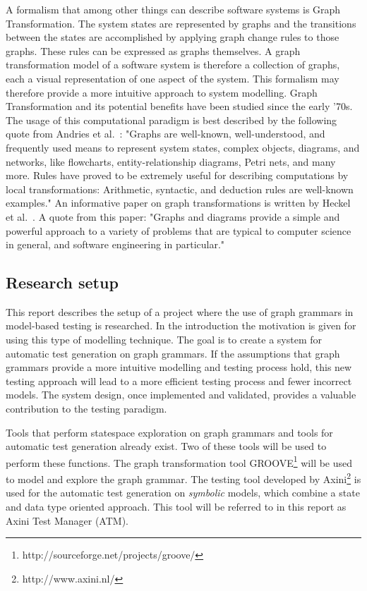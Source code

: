 A formalism that among other things can describe software systems is Graph Transformation. The system states are represented by graphs and the transitions between the states are accomplished by applying graph change rules to those graphs. These rules can be expressed as graphs themselves. A graph transformation model of a software system is therefore a collection of graphs, each a visual representation of one aspect of the system. This formalism may therefore provide a more intuitive approach to system modelling. Graph Transformation and its potential benefits have been studied since the early '70s. The usage of this computational paradigm is best described by the following quote from Andries et al.~\cite{Andries1999}: "Graphs are well-known, well-understood, and frequently used means to represent system states, complex objects, diagrams, and networks, like flowcharts, entity-relationship diagrams, Petri nets, and many more. Rules have proved to be extremely useful for describing computations by local transformations: Arithmetic, syntactic, and deduction rules are well-known examples." An informative paper on graph transformations is written by Heckel et al.~\cite{Heckel2006187}. A quote from this paper: "Graphs and diagrams provide a simple and powerful approach to a variety of problems that are typical to computer science in general, and software engineering in particular."

\subsection{Research setup}
This report describes the setup of a project where the use of graph grammars in model-based testing is researched. In the introduction the motivation is given for using this type of modelling technique. The goal is to create a system for automatic test generation on graph grammars. If the assumptions that graph grammars provide a more intuitive modelling and testing process hold, this new testing approach will lead to a more efficient testing process and fewer incorrect models. The system design, once implemented and validated, provides a valuable contribution to the testing paradigm.

Tools that perform statespace exploration on graph grammars and tools for automatic test generation already exist. Two of these tools will be used to perform these functions. The graph transformation tool GROOVE\footnote{http://sourceforge.net/projects/groove/} will be used to model and explore the graph grammar. The testing tool developed by Axini\footnote{http://www.axini.nl/} is used for the automatic test generation on \textit{symbolic} models, which combine a state and data type oriented approach. This tool will be referred to in this report as Axini Test Manager (ATM).

